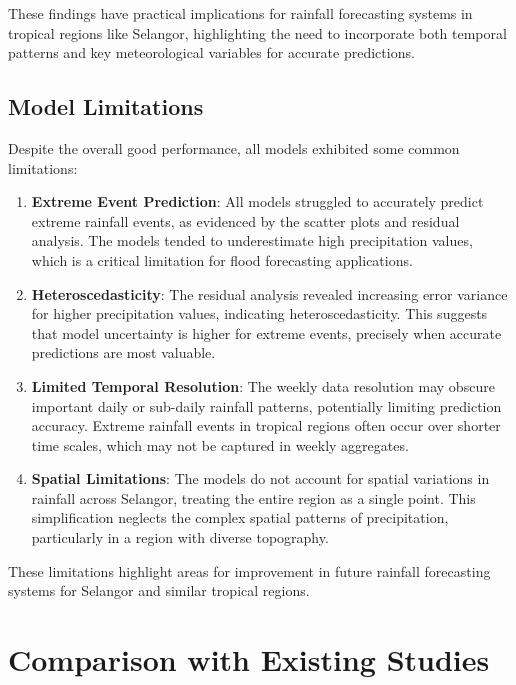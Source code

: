 \documentclass[12pt]{article}
\begin{document}
These findings have practical implications for rainfall forecasting systems in tropical regions like Selangor, highlighting the need to incorporate both temporal patterns and key meteorological variables for accurate predictions.

\subsection{Model Limitations}
\label{subsec:model_limitations}

Despite the overall good performance, all models exhibited some common limitations:

\begin{enumerate}
    \item \textbf{Extreme Event Prediction}: All models struggled to accurately predict extreme rainfall events, as evidenced by the scatter plots and residual analysis. The models tended to underestimate high precipitation values, which is a critical limitation for flood forecasting applications.
    
    \item \textbf{Heteroscedasticity}: The residual analysis revealed increasing error variance for higher precipitation values, indicating heteroscedasticity. This suggests that model uncertainty is higher for extreme events, precisely when accurate predictions are most valuable.
    
    \item \textbf{Limited Temporal Resolution}: The weekly data resolution may obscure important daily or sub-daily rainfall patterns, potentially limiting prediction accuracy. Extreme rainfall events in tropical regions often occur over shorter time scales, which may not be captured in weekly aggregates.
    
    \item \textbf{Spatial Limitations}: The models do not account for spatial variations in rainfall across Selangor, treating the entire region as a single point. This simplification neglects the complex spatial patterns of precipitation, particularly in a region with diverse topography.
\end{enumerate}

These limitations highlight areas for improvement in future rainfall forecasting systems for Selangor and similar tropical regions.

\section{Comparison with Existing Studies}
\label{sec:comparison_studies}
\end{document}
